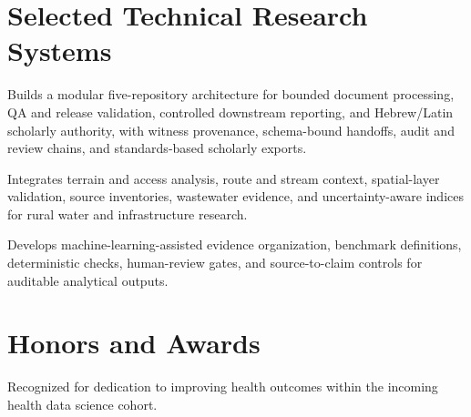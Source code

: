 \documentclass[10.5pt,letterpaper]{article}
\begin{document}



\section*{Selected Technical Research Systems}
\begin{cvbullets}
    \item Builds a modular five-repository architecture for bounded document processing, QA and release validation, controlled downstream reporting, and Hebrew/Latin scholarly authority, with witness provenance, schema-bound handoffs, audit and review chains, and standards-based scholarly exports.
\end{cvbullets}

\begin{cvbullets}
    \item Integrates terrain and access analysis, route and stream context, spatial-layer validation, source inventories, wastewater evidence, and uncertainty-aware indices for rural water and infrastructure research.
\end{cvbullets}

\begin{cvbullets}
    \item Develops machine-learning-assisted evidence organization, benchmark definitions, deterministic checks, human-review gates, and source-to-claim controls for auditable analytical outputs.
\end{cvbullets}

\section*{Honors and Awards}
\begin{cvbullets}
    \item Recognized for dedication to improving health outcomes within the incoming health data science cohort.
\end{cvbullets}
\end{document}
